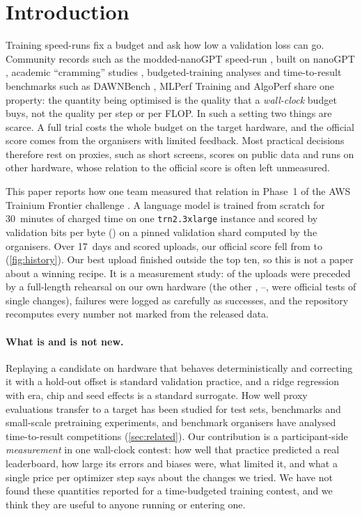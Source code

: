 \section{Introduction}

Training speed-runs fix a budget and ask how low a validation loss can go. Community records such as the
modded-nanoGPT speed-run \citep{jordan2024moddednanogpt}, built on nanoGPT \citep{karpathy2022nanogpt}, academic
``cramming'' studies \citep{geiping2023cramming,izsak2021academic}, budgeted-training analyses \citep{li2020budgeted}
and time-to-result benchmarks such as DAWNBench \citep{coleman2017dawnbench}, MLPerf Training
\citep{mattson2020mlperf} and AlgoPerf
\citep{dahl2023algoperf} share one property: the quantity being optimised is the quality that a \emph{wall-clock}
budget buys, not the quality per step or per FLOP. In such a setting two things are scarce. A full trial costs the
whole budget on the target hardware, and the official score comes from the organisers with limited feedback. Most
practical decisions therefore rest on proxies, such as short screens, scores on public data and runs on other
hardware, whose relation to the official score is often left unmeasured.

This paper reports how one team measured that relation in Phase~1 of the AWS Trainium Frontier challenge
\citep{trainiumfrontier2026rules}. A language model is trained from scratch for 30~minutes of charged time on one
\texttt{trn2.3xlarge} instance and scored by validation bits per byte (\valbpb{}) on a pinned validation shard
computed by the organisers. Over 17~days and  scored uploads, our official score fell from
 to  (\cref{fig:history}). Our best upload finished outside the top ten, so
this is not a paper about a winning recipe. It is a measurement study:  of the 
uploads were preceded by a full-length rehearsal on our own hardware (the other , --, were
official tests of single changes), failures were logged as carefully as successes, and the repository recomputes
every number not marked \docnum{} from the released data.

\paragraph{What is and is not new.} Replaying a candidate on hardware that behaves deterministically and correcting it
with a hold-out offset is standard validation practice, and a ridge regression with era, chip and seed effects is a
standard surrogate. How well proxy evaluations transfer to a target has been studied for test sets, benchmarks and
small-scale pretraining experiments, and benchmark organisers have analysed time-to-result competitions
(\cref{sec:related}). Our contribution is a participant-side \emph{measurement} in one wall-clock contest: how well
that practice predicted a real leaderboard, how large its errors and biases were, what limited it, and what a single
price per optimizer step says about the changes we tried. We have not found these quantities reported for a
time-budgeted training contest, and we think they are useful to anyone running or entering one.

